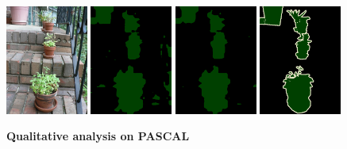 \begin{figure}[tbhp!]
  {\includegraphics[width=0.24\textwidth]{figures/experiments/pascal/orgckpt/0070.jpg}}
  {\includegraphics[width=0.24\textwidth]{figures/experiments/pascal/orgckpt/0070.png}}
  {\includegraphics[width=0.24\textwidth]{figures/experiments/pascal/nonnoisybaseline/0070.png}}
  {\includegraphics[width=0.24\textwidth]{figures/experiments/pascal/gt/2007_002284.png}}

  \caption[\textbf{Qualitative analysis on PASCAL}]{\textbf{Qualitative analysis on PASCAL}}
  \label{fig:qualpascal}
\end{figure}